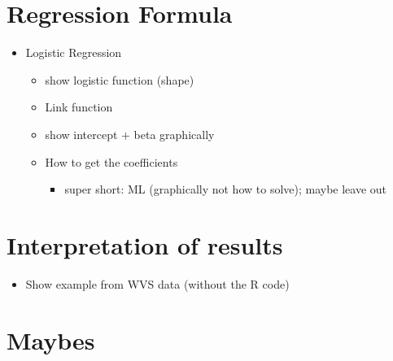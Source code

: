 \documentclass[
]{book}
\providecommand{\tightlist}{%
  \setlength{\itemsep}{0pt}\setlength{\parskip}{0pt}}
\begin{document}
\hypertarget{regression-formula-1}{%
\section{Regression Formula}\label{regression-formula-1}}

\begin{itemize}
\tightlist
\item
  Logistic Regression

  \begin{itemize}
  \tightlist
  \item
    show logistic function (shape)
  \item
    Link function
  \item
    show intercept + beta graphically
  \item
    How to get the coefficients

    \begin{itemize}
    \tightlist
    \item
      super short: ML (graphically not how to solve); maybe leave out
    \end{itemize}
  \end{itemize}
\end{itemize}

\hypertarget{interpretation-of-results}{%
\section{Interpretation of results}\label{interpretation-of-results}}

\begin{itemize}
\tightlist
\item
  Show example from WVS data (without the R code)
\end{itemize}

\hypertarget{maybes-1}{%
\section{Maybes}\label{maybes-1}}
\end{document}
